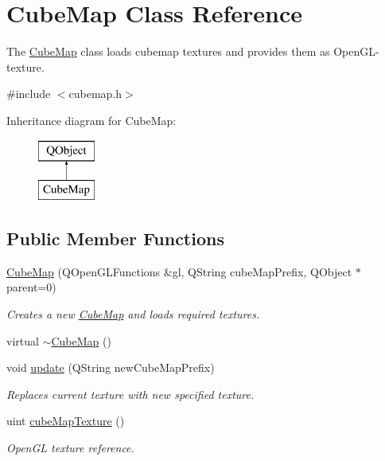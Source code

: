 \hypertarget{class_cube_map}{}\section{Cube\+Map Class Reference}
\label{class_cube_map}


The \hyperlink{class_cube_map}{Cube\+Map} class loads cubemap textures and provides them as Open\+G\+L-\/texture.  




{\ttfamily \#include $<$cubemap.\+h$>$}

Inheritance diagram for Cube\+Map\+:\begin{figure}[H]
\begin{center}
\leavevmode
\includegraphics[height=2.000000cm]{class_cube_map}
\end{center}
\end{figure}
\subsection*{Public Member Functions}
\begin{DoxyCompactItemize}
\item 
\hyperlink{class_cube_map_ac1b76abb3b551a933b23f31038855699}{Cube\+Map} (Q\+Open\+G\+L\+Functions \&gl, Q\+String cube\+Map\+Prefix, Q\+Object $\ast$parent=0)
\begin{DoxyCompactList}\small\item\em Creates a new \hyperlink{class_cube_map}{Cube\+Map} and loads required textures. \end{DoxyCompactList}\item 
virtual \hyperlink{class_cube_map_ac4c453248cd7022d3b268755b2dd218e}{$\sim$\+Cube\+Map} ()
\item 
void \hyperlink{class_cube_map_a5d772f8a6b43356593dc909a704354eb}{update} (Q\+String new\+Cube\+Map\+Prefix)
\begin{DoxyCompactList}\small\item\em Replaces current texture with new specified texture. \end{DoxyCompactList}\item 
uint \hyperlink{class_cube_map_a23189c7b896857a6080d1ceb1abf8e4a}{cube\+Map\+Texture} ()
\begin{DoxyCompactList}\small\item\em Open\+G\+L texture reference. \end{DoxyCompactList}\end{DoxyCompactItemize}
